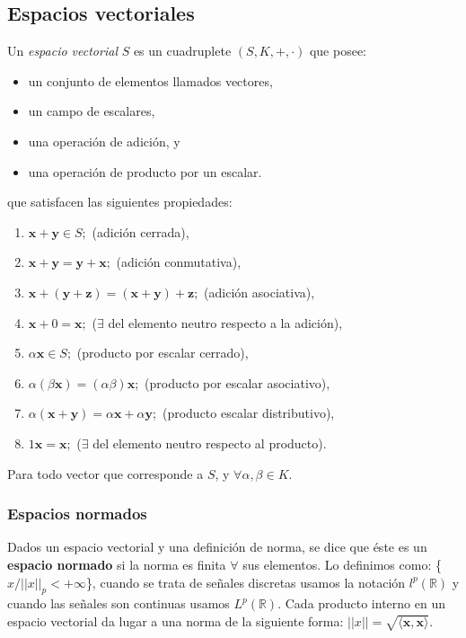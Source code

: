 \documentclass[10pt,a4paper]{book}
\begin{document}
\subsection{Espacios vectoriales}
Un \textit{espacio vectorial} $S$ es un cuadruplete $(S,K,+,\cdot)$ que posee:
\begin{itemize}
\item un conjunto de elementos llamados vectores, 
\item un campo de escalares, 
\item una operación de adición, y
\item una operación de producto por un escalar.
\end{itemize}
que satisfacen las siguientes propiedades:
\begin{enumerate}
\item $\mathbf{x}+\mathbf{y}\in S;$ (adición cerrada),
\item $\mathbf{x}+\mathbf{y}=\mathbf{y}+\mathbf{x};$ (adición conmutativa),
\item $\mathbf{x}+(\mathbf{y}+\mathbf{z})=(\mathbf{x}+\mathbf{y})+\mathbf{z};$ (adición asociativa),
\item $\mathbf{x}+0=\mathbf{x};$ ($\exists$ del elemento neutro respecto a la adición),
\item $\alpha \mathbf{x} \in S;$ (producto por escalar cerrado),
\item $\alpha(\beta \mathbf{x})=(\alpha \beta)\mathbf{x};$ (producto por escalar asociativo),
\item $\alpha(\mathbf{x}+\mathbf{y})=\alpha\mathbf{x}+\alpha\mathbf{y};$ (producto escalar distributivo),
\item $1\mathbf{x}=\mathbf{x};$ ($\exists$ del elemento neutro respecto al producto).
\end{enumerate}
Para todo vector que corresponde a $S$, y $\forall \alpha, \beta \in K$.

\subsubsection{Espacios normados}
Dados un espacio vectorial y una definición de norma, se dice que éste es un \textbf{espacio normado} si la norma es finita $\forall$ sus elementos. Lo definimos como: \{$x/||x||_p < +\infty$\}, cuando se trata de señales discretas usamos la notación $l^p(\mathbb{R})$ y cuando las señales son continuas usamos $L^p(\mathbb{R})$. Cada producto interno en un espacio vectorial da lugar a una norma de la siguiente forma: $||x||=\sqrt{\langle\mathbf{x},\mathbf{x}\rangle}$.
\end{document}
